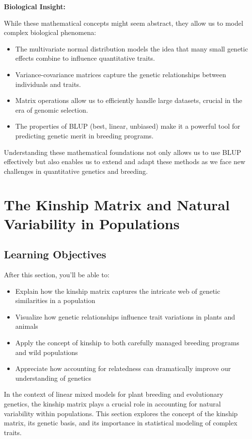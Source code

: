\documentclass[12pt,a4paper]{article}
\newenvironment{biologicalinsightbox}[1][]
{\begin{basebox}[linecolor=uqpurple]
\textbf{\color{uqpurple}Biological Insight:} \textit{#1}\par\noindent\ignorespaces}
{\end{basebox}}
\begin{document}
\begin{biologicalinsightbox}
While these mathematical concepts might seem abstract, they allow us to model complex biological phenomena:

\begin{itemize}
    \item The multivariate normal distribution models the idea that many small genetic effects combine to influence quantitative traits.
    \item Variance-covariance matrices capture the genetic relationships between individuals and traits.
    \item Matrix operations allow us to efficiently handle large datasets, crucial in the era of genomic selection.
    \item The properties of BLUP (best, linear, unbiased) make it a powerful tool for predicting genetic merit in breeding programs.
\end{itemize}
\end{biologicalinsightbox}

Understanding these mathematical foundations not only allows us to use BLUP effectively but also enables us to extend and adapt these methods as we face new challenges in quantitative genetics and breeding.

\section{The Kinship Matrix and Natural Variability in Populations}
\subsection{Learning Objectives}
After this section, you'll be able to:
\begin{itemize}
    \item Explain how the kinship matrix captures the intricate web of genetic similarities in a population
    \item Visualize how genetic relationships influence trait variations in plants and animals
    \item Apply the concept of kinship to both carefully managed breeding programs and wild populations
    \item Appreciate how accounting for relatedness can dramatically improve our understanding of genetics
\end{itemize}

In the context of linear mixed models for plant breeding and evolutionary genetics, the kinship matrix plays a crucial role in accounting for natural variability within populations. This section explores the concept of the kinship matrix, its genetic basis, and its importance in statistical modeling of complex traits.
\end{document}
